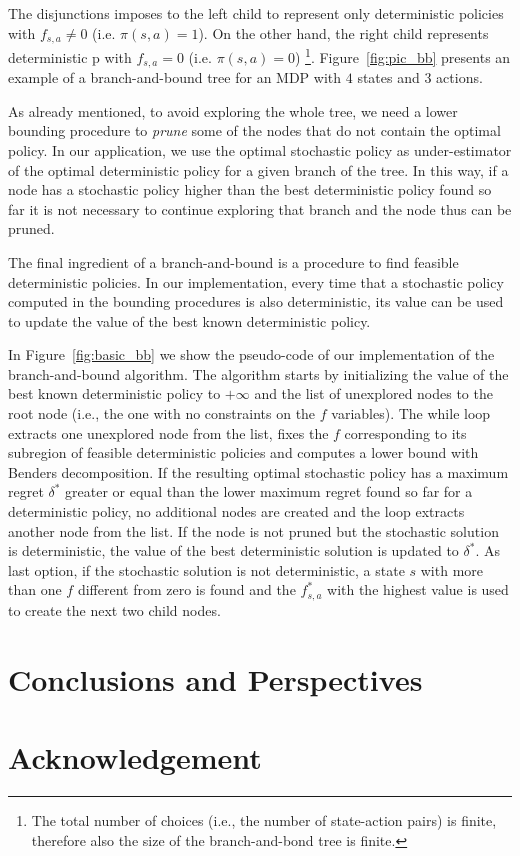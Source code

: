 \documentclass[runningheads,a4paper]{llncs}
\begin{document}
The disjunctions imposes to the left child to represent only deterministic policies with $f_{s,a}\neq 0$  (i.e. $\pi(s,a)=1$). On the other hand, the right child represents deterministic p with $f_{s,a}=0$  (i.e. $\pi(s,a)=0$)
\footnote{The total number of choices (i.e., the number of state-action pairs) is finite, therefore also the size of the branch-and-bond tree is finite.}. Figure~\ref{fig:pic_bb} presents an example of a branch-and-bound tree for an MDP with $4$ states and $3$ actions. 
 

As already mentioned, to avoid exploring the whole tree, we need a lower bounding procedure to \textit{prune} some of the nodes that do not contain the optimal policy. In our application, we use the optimal stochastic policy as under-estimator of the optimal deterministic policy for a given branch of the tree. In this way, if a node has a stochastic policy higher than the best deterministic policy found so far it is not necessary to continue exploring that branch and the node thus can be pruned.

The final ingredient of a branch-and-bound is a procedure to find feasible deterministic policies. In our implementation, every time that a stochastic policy computed in the bounding procedures is also deterministic, its value can be used to update the value of the best known deterministic policy. %




In Figure~\ref{fig:basic_bb} we show the pseudo-code of our implementation of the branch-and-bound algorithm. The algorithm starts by initializing the value of the best known deterministic policy to $+\infty$ and the list of unexplored nodes to the root node (i.e., the one with no constraints on the $f$ variables).
The while loop extracts one unexplored node from the list, fixes the $f$ corresponding to its subregion of feasible deterministic policies and computes a lower bound with Benders decomposition. If the resulting optimal stochastic policy has a maximum regret $\delta^*$ greater or equal than the lower maximum regret found so far for a deterministic policy, no additional nodes are created and the loop extracts another node from the list. If the node is not pruned but the stochastic solution is deterministic, the value of the best deterministic solution is updated to $\delta^*$. As last option, if the stochastic solution is not deterministic, a state $s$ with more than one $f$ different from zero is found and the $f^*_{s,a}$ with the highest value is used to create the next two child nodes.






 
\section{Conclusions and Perspectives}
		


\section*{Acknowledgement}



\end{document}
